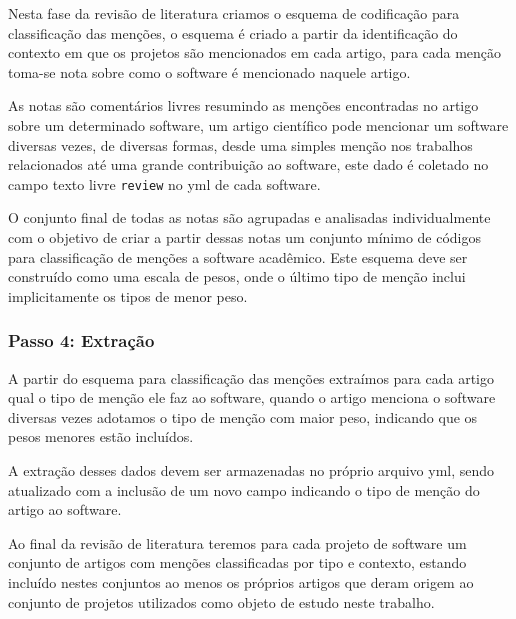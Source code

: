 Nesta fase da revisão de literatura criamos o esquema de codificação para
classificação das menções, o esquema é criado a partir da identificação do
contexto em que os projetos são mencionados em cada artigo, para cada menção
toma-se nota sobre como o software é mencionado naquele artigo.

As notas são comentários livres resumindo as menções encontradas no artigo
sobre um determinado software, um artigo científico pode mencionar um software
diversas vezes, de diversas formas, desde uma simples menção nos trabalhos
relacionados até uma grande contribuição ao software, este dado é coletado no
campo texto livre \texttt{review} no yml de cada software.

O conjunto final de todas as notas são agrupadas e analisadas individualmente
com o objetivo de criar a partir dessas notas um conjunto mínimo de códigos
para classificação de menções a software acadêmico. Este esquema deve ser construído
como uma escala de pesos, onde o último tipo de menção inclui implicitamente os
tipos de menor peso.



\subsubsection{Passo 4: Extração}

A partir do esquema para classificação das menções extraímos para cada artigo
qual o tipo de menção ele faz ao software, quando o artigo menciona o software
diversas vezes adotamos o tipo de menção com maior peso, indicando que os pesos
menores estão incluídos.


A extração desses dados devem ser armazenadas no próprio arquivo yml, sendo
atualizado com a inclusão de um novo campo indicando o tipo de menção do artigo
ao software.

Ao final da revisão de literatura teremos para cada projeto de software um
conjunto de artigos com menções classificadas por tipo e contexto, estando
incluído nestes conjuntos ao menos os próprios artigos que deram origem ao
conjunto de projetos utilizados como objeto de estudo neste trabalho.

